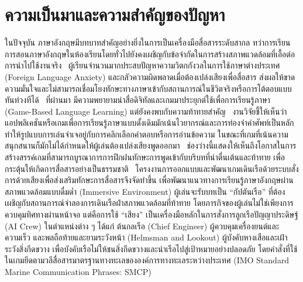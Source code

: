 
\section{ความเป็นมาและความสำคัญของปัญหา}
ในปัจจุบัน ภาษาอังกฤษมีบทบาทสำคัญอย่างยิ่งในการเป็นเครื่องมือสื่อสารระดับสากล ทว่าการเรียนการสอนภาษาอังกฤษในห้องเรียนโดยทั่วไปยังคงเผชิญกับข้อจำกัดในการสร้างสภาพแวดล้อมที่เอื้อต่อการนำไปใช้งานจริง~\cite{sadigzade2025} ผู้เรียนจำนวนมากประสบปัญหาความวิตกกังวลในการใช้ภาษาต่างประเทศ (Foreign Language Anxiety) และกลัวความผิดพลาดเมื่อต้องเปล่งเสียงเพื่อสื่อสาร ส่งผลให้ขาดความมั่นใจและไม่สามารถเชื่อมโยงทักษะทางภาษาเข้ากับสถานการณ์ในชีวิตจริงหรือการโต้ตอบแบบทันท่วงทีได้~\cite{varma2025}
ที่ผ่านมา มีความพยายามนำสื่อดิจิทัลและเกมมาประยุกต์ใช้เพื่อการเรียนรู้ภาษา (Game-Based Language Learning) แต่ยังคงพบกับความท้าทายสำคัญ~\cite{sadigzade2025} งานวิจัยชี้ให้เห็นว่าแอปพลิเคชันหรือเกมเพื่อการเรียนรู้ภาษาแบบดั้งเดิมมักเน้นไวยากรณ์และการท่องจำคำศัพท์เป็นหลัก ทำให้รูปแบบการเล่นจำเจอยู่กับการคลิกเลือกคำตอบหรือการอ่านข้อความ ในขณะที่เกมที่เน้นความสนุกสนานก็มักไม่ได้กำหนดให้ผู้เล่นต้องเปล่งเสียงพูดออกมา~\cite{varma2025} ช่องว่างนี้แสดงให้เห็นถึงโอกาสในการสร้างสรรค์เกมที่สามารถบูรณาการการฝึกฝนทักษะการพูดเข้ากับบริบทที่น่าตื่นเต้นและท้าทาย เพื่อกระตุ้นให้เกิดการสื่อสารอย่างเป็นธรรมชาติ~\cite{zargham2024}
โครงงานการออกแบบและพัฒนาเกมเดินเรือด้วยระบบสั่งการด้วยเสียงเพื่อส่งเสริมทักษะการสื่อสารจึงจัดทำขึ้น เพื่อพัฒนาแนวทางการเรียนรู้ภาษาอังกฤษผ่านสภาพแวดล้อมแบบดื่มด่ำ (Immersive Environment) ผู้เล่นจะรับบทเป็น ``กัปตันเรือ'' ที่ต้องเผชิญกับสถานการณ์จำลองการเดินเรือฝ่าสภาพแวดล้อมที่ท้าทาย โดยภารกิจของผู้เล่นไม่ใช่เพียงการควบคุมทิศทางผ่านหน้าจอ แต่คือการใช้ ``เสียง'' เป็นเครื่องมือหลักในการสั่งการลูกเรือปัญญาประดิษฐ์ (AI Crew) ในตำแหน่งต่าง ๆ ได้แก่ ต้นกลเรือ (Chief Engineer) ผู้ควบคุมเครื่องยนต์และความเร็ว และพลถือท้ายและยามระวังหน้า (Helmsman and Lookout) ผู้บังคับหางเสือและเฝ้าระวังสิ่งกีดขวาง เพื่อบังคับเรือไม่ให้ชนสิ่งกีดขวางและนำเรือไปสู่เป้าหมายอย่างปลอดภัย โดยคำสั่งที่ใช้ในเกมยึดตามวลีสื่อสารมาตรฐานทางทะเลขององค์การทางทะเลระหว่างประเทศ (IMO Standard Marine Communication Phrases: SMCP)~\cite{imo2002smcp}

